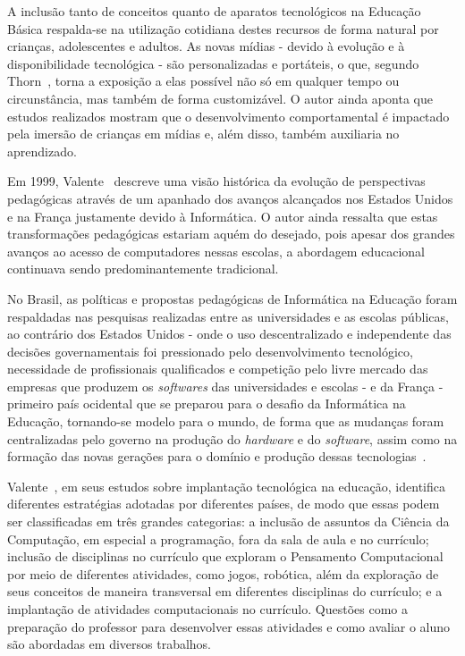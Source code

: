 A inclusão tanto de conceitos quanto de aparatos tecnológicos na Educação Básica respalda-se na utilização cotidiana destes recursos de forma natural por crianças, adolescentes e adultos. As novas mídias - devido à evolução e à disponibilidade tecnológica - são personalizadas e portáteis, o que, segundo Thorn~\cite{thorn_preschool_2008}, torna a exposição a elas possível não só em qualquer tempo ou circunstância, mas também de forma customizável. O autor ainda aponta que estudos realizados mostram que o desenvolvimento comportamental é impactado pela imersão de crianças em mídias e, além disso, também auxiliaria no aprendizado.

Em 1999, Valente~\cite{valente_informatica_1999} descreve uma visão histórica da evolução de perspectivas pedagógicas através de um apanhado dos avanços alcançados nos Estados Unidos e na França justamente devido à Informática. O autor ainda ressalta que estas transformações pedagógicas estariam aquém do desejado, pois apesar dos grandes avanços ao acesso de computadores nessas escolas, a abordagem educacional continuava sendo predominantemente tradicional.

No Brasil, as políticas e propostas pedagógicas de Informática na Educação foram respaldadas nas pesquisas realizadas entre as universidades e as escolas públicas, ao contrário dos Estados Unidos - onde o uso descentralizado e independente das decisões governamentais foi pressionado pelo desenvolvimento tecnológico, necessidade de profissionais qualificados e competição pelo livre mercado das empresas que produzem os \textit{softwares} das universidades e escolas - e da França - primeiro país ocidental que se preparou para o desafio da Informática na Educação, tornando-se modelo para o mundo, de forma que as mudanças foram centralizadas pelo governo na produção do \textit{hardware} e do \textit{software}, assim como na formação das novas gerações para o domínio e produção dessas tecnologias~\cite{valente_informatica_1999}. 

Valente~\cite{valente_integracao_2016}, em seus estudos sobre implantação tecnológica na educação, identifica diferentes estratégias adotadas por diferentes países, de modo que essas podem ser classificadas em três grandes categorias: a inclusão de assuntos da Ciência da Computação, em especial a programação, fora da sala de aula e no currículo; inclusão de disciplinas no currículo que exploram o Pensamento Computacional por meio de diferentes atividades, como jogos, robótica, além da exploração de seus conceitos de maneira transversal em diferentes disciplinas do currículo; e a implantação de atividades computacionais no currículo. Questões como a preparação do professor para desenvolver essas atividades e como avaliar o aluno são abordadas em diversos trabalhos.


